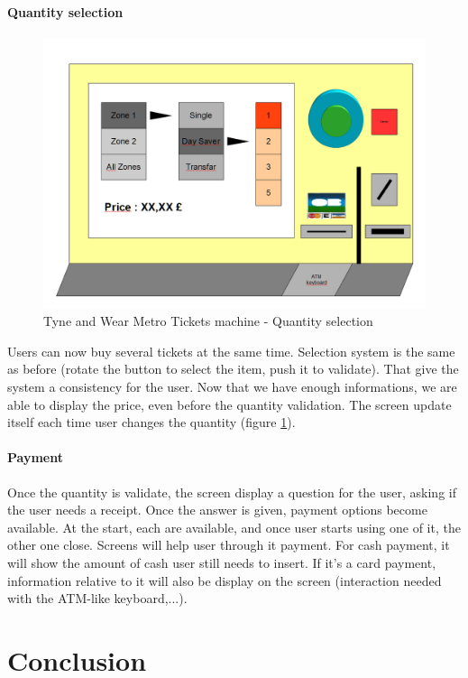 \documentclass[a4paper,12pt]{article} %
\begin{document}
\paragraph{Quantity selection} 
\begin{figure}[h!]
\includegraphics[width=1\linewidth]{interaction4.png}
\caption{\label{ticket2} Tyne and Wear Metro Tickets machine - Quantity selection}
\end{figure}
Users can now buy several tickets at the same time. Selection system is the same as before (rotate the button to select the item, push it to validate). That give the system a consistency for the user. Now that we have enough informations, we are able to display the price, even before the quantity validation. The screen update itself each time user changes the quantity (figure \ref{ticket2}). 
\paragraph{Payment} Once the quantity is validate, the screen display a question for the user, asking if the user needs a receipt. Once the answer is given, payment options become available. At the start, each are available, and once user starts using one of it, the other one close. Screens will help user through it payment. For cash payment, it will show the amount of cash user still needs to insert. If it's a card payment, information relative to it will also be display on the screen (interaction needed with the ATM-like keyboard,...).

\newpage
\section*{Conclusion}
\end{document}

